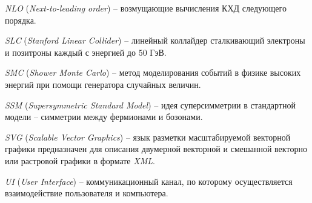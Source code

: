 \textit{NLO} (\textit{Next-to-leading order}) -- возмущающие вычисления КХД следующего порядка.

\textit{SLC} (\textit{Stanford Linear Collider}) -- линейный коллайдер сталкивающий электроны и позитроны каждый с энергией до 50 ГэВ.

\textit{SMC} (\textit{Shower Monte Carlo}) -- метод моделирования событий в физике высоких энергий при помощи генератора случайных величин.

\textit{SSM} (\textit{Supersymmetric Standard
Model}) -- идея суперсимметрии в стандартной модели -- симметрии между фермионами и бозонами. 

\textit{SVG} (\textit{Scalable Vector Graphics}) -- язык разметки масштабируемой векторной графики предназначен для описания двумерной векторной и смешанной векторно или растровой графики в формате \textit{XML}.

\textit{UI} (\textit{User Interface}) -- коммуникационный канал, по которому осуществляется взаимодействие пользователя и компьютера.

